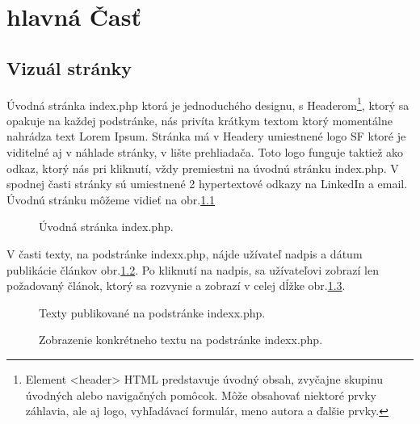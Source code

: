 \chapter{hlavná Časť}
\section{Vizuál stránky}

Úvodná stránka index.php ktorá je jednoduchého designu, s Headerom\footnote[1]{Element <header> HTML predstavuje úvodný obsah, zvyčajne skupinu úvodných alebo navigačných pomôcok. Môže obsahovať niektoré prvky záhlavia, ale aj logo, vyhľadávací formulár, meno autora a ďalšie prvky.}, ktorý sa opakuje na každej podstránke, nás privíta krátkym textom ktorý momentálne nahrádza text Lorem Ipsum. Stránka má v Headery umiestnené logo SF ktoré je viditelné aj v náhlade stránky, v lište prehliadača. Toto logo funguje taktiež ako odkaz, ktorý nás pri kliknutí, vždy premiestni na úvodnú stránku index.php. V spodnej časti stránky sú umiestnené 2 hypertextové odkazy na LinkedIn a email. Úvodnú stránku môžeme vidieť na obr.\ref{OBRAZOK 1.1}

\begin{figure}[!tbh]
\centering
\setlength{\fboxsep}{0pt}%
\setlength{\fboxrule}{1pt}%
\caption{Úvodná stránka index.php.}\label{OBRAZOK 1.1}
\end{figure}

\vspace{4cm}

V časti texty, na podstránke indexx.php, nájde užívateľ nadpis a dátum publikácie článkov obr.\ref{OBRAZOK 1.2}. Po kliknutí na nadpis, sa užívateľovi zobrazí len požadovaný článok, ktorý sa rozvynie a zobrazí v celej dĺžke obr.\ref{OBRAZOK 1.3}.

\begin{figure}[!tbh]
\centering
\setlength{\fboxsep}{0pt}%
\setlength{\fboxrule}{1pt}%
\caption{Texty publikované na podstránke indexx.php.}\label{OBRAZOK 1.2}
\end{figure}

\begin{figure}[!tbh]
\centering
\setlength{\fboxsep}{0pt}%
\setlength{\fboxrule}{1pt}%
\caption{Zobrazenie konkrétneho textu na podstránke indexx.php.}\label{OBRAZOK 1.3}
\end{figure}


